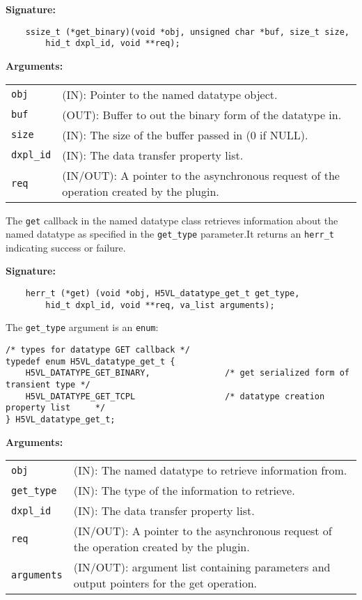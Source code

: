 \begin{mdframed}[style=bgbox]
\textbf{Signature:}
\begin{lstlisting}
    ssize_t (*get_binary)(void *obj, unsigned char *buf, size_t size, 
        hid_t dxpl_id, void **req);
\end{lstlisting}

\textbf{Arguments:}\\
\begin{tabular}{l p{13.5cm}}
  \texttt{obj} & (IN): Pointer to the named datatype object.\\
  \texttt{buf} & (OUT): Buffer to out the binary form of the datatype in.\\
  \texttt{size} & (IN): The size of the buffer passed in (0 if NULL).\\
  \texttt{dxpl\_id} & (IN): The data transfer property list.\\
  \texttt{req} & (IN/OUT): A pointer to the asynchronous request of the
  operation created by the plugin.\\
\end{tabular}
\end{mdframed}

The \texttt{get} callback in the named datatype class retrieves
information about the named datatype as specified in the \texttt{get\_type}
parameter.It returns an \texttt{herr\_t} indicating success or failure.\bigskip

\begin{mdframed}[style=bgbox]
\textbf{Signature:}
\begin{lstlisting}
    herr_t (*get) (void *obj, H5VL_datatype_get_t get_type, 
        hid_t dxpl_id, void **req, va_list arguments);
\end{lstlisting}

The \texttt{get\_type} argument is an \texttt{enum}:
\begin{lstlisting}
/* types for datatype GET callback */
typedef enum H5VL_datatype_get_t {
    H5VL_DATATYPE_GET_BINARY,               /* get serialized form of transient type */
    H5VL_DATATYPE_GET_TCPL                  /* datatype creation property list     */
} H5VL_datatype_get_t;
\end{lstlisting}

\textbf{Arguments:}\\
\begin{tabular}{l p{13.5cm}}
  \texttt{obj} & (IN): The named datatype to retrieve information from.\\
  \texttt{get\_type} & (IN): The type of the information to retrieve.\\
  \texttt{dxpl\_id} & (IN): The data transfer property list.\\
  \texttt{req} & (IN/OUT): A pointer to the asynchronous request of the
  operation created by the plugin.\\
  \texttt{arguments} & (IN/OUT): argument list containing parameters and
  output pointers for the get operation. \\
\end{tabular}
\end{mdframed}

